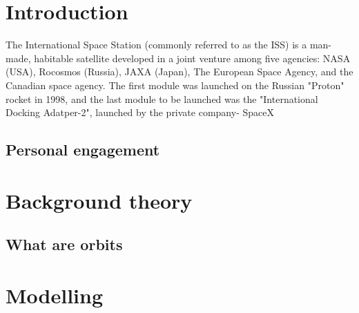 \documentclass[12pt]{article}
\begin{document}
    \tableofcontents
    \thispagestyle{empty}
    \newpage
    
 
    \addtocounter{page}{-1}
    \section{Introduction} %
    The International Space Station (commonly referred to as the ISS) is a man-made, habitable satellite developed in a joint venture among five agencies: NASA (USA), 
    Rocosmos (Russia), JAXA (Japan), The European Space Agency, and the Canadian space agency. The first module was launched on the Russian "Proton" rocket in 1998, 
    and the last module to be launched was the "International Docking Adatper-2", launched by the private company- SpaceX

        \subsection{Personal engagement}



    \section{Background theory}
        \subsection{What are orbits}
    \section{Modelling}

    
\end{document}
